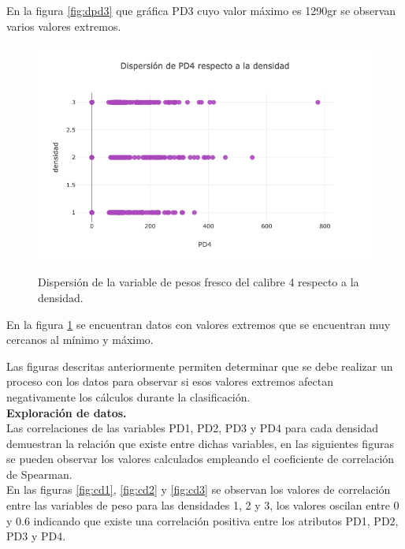 En la figura \ref{fig:dpd3} que gráfica PD3 cuyo valor máximo es 1290gr se observan varios valores extremos.

\begin{figure}[h!]
	\caption{Dispersión de la variable de pesos fresco del calibre 4 respecto a la densidad.}
	\centering
	\includegraphics[scale=0.5]{d-pd4.png}
	\label{fig:dpd4}
\end{figure}

En la figura \ref{fig:dpd4} se encuentran datos con valores extremos que se encuentran muy cercanos al mínimo y máximo.

Las figuras descritas anteriormente permiten determinar que se debe realizar un proceso con los datos para observar si esos valores extremos afectan negativamente los cálculos durante la clasificación.\\


\noindent
\textbf{Exploración de datos.}\\

Las correlaciones de las variables PD1, PD2, PD3 y PD4 para cada densidad demuestran la relación que existe entre dichas variables, en las siguientes figuras se pueden observar los valores calculados empleando el coeficiente de correlación de Spearman.\\

En las figuras \ref{fig:cd1}, \ref{fig:cd2} y \ref{fig:cd3} se observan los valores de correlación entre las variables de peso para las densidades 1, 2 y 3, los valores oscilan entre 0 y 0.6 indicando que existe una correlación positiva entre los atributos PD1, PD2, PD3 y PD4.\\\\\\\\\\\\\\\\

